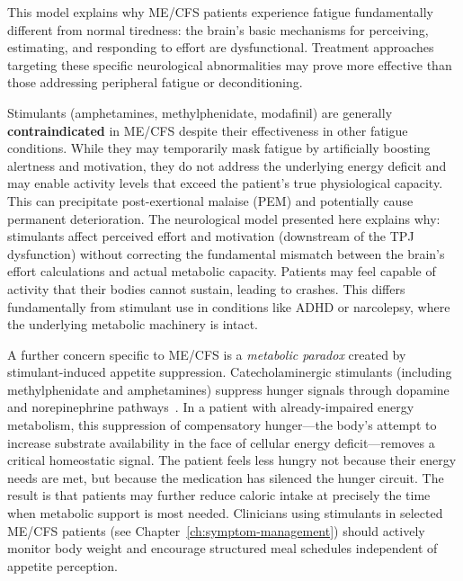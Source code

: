 This model explains why ME/CFS patients experience fatigue fundamentally different from normal tiredness: the brain's basic mechanisms for perceiving, estimating, and responding to effort are dysfunctional. Treatment approaches targeting these specific neurological abnormalities may prove more effective than those addressing peripheral fatigue or deconditioning.

\begin{warning}
Stimulants (amphetamines, methylphenidate, modafinil) are generally \textbf{contraindicated} in ME/CFS despite their effectiveness in other fatigue conditions. While they may temporarily mask fatigue by artificially boosting alertness and motivation, they do not address the underlying energy deficit and may enable activity levels that exceed the patient's true physiological capacity. This can precipitate post-exertional malaise (PEM) and potentially cause permanent deterioration. The neurological model presented here explains why: stimulants affect perceived effort and motivation (downstream of the TPJ dysfunction) without correcting the fundamental mismatch between the brain's effort calculations and actual metabolic capacity. Patients may feel capable of activity that their bodies cannot sustain, leading to crashes. This differs fundamentally from stimulant use in conditions like ADHD or narcolepsy, where the underlying metabolic machinery is intact.

A further concern specific to ME/CFS is a \emph{metabolic paradox} created by stimulant-induced appetite suppression. Catecholaminergic stimulants (including methylphenidate and amphetamines) suppress hunger signals through dopamine and norepinephrine pathways~\cite{Volkow2012brain}. In a patient with already-impaired energy metabolism, this suppression of compensatory hunger---the body's attempt to increase substrate availability in the face of cellular energy deficit---removes a critical homeostatic signal. The patient feels less hungry not because their energy needs are met, but because the medication has silenced the hunger circuit. The result is that patients may further reduce caloric intake at precisely the time when metabolic support is most needed. Clinicians using stimulants in selected ME/CFS patients (see Chapter~\ref{ch:symptom-management}) should actively monitor body weight and encourage structured meal schedules independent of appetite perception.
\end{warning}

